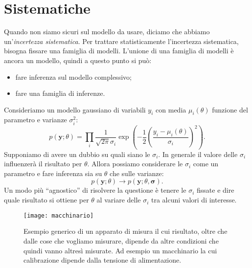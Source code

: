 
\section{Sistematiche}

Quando non siamo sicuri sul modello da usare,
diciamo che abbiamo un'\emph{incertezza sistematica}.
Per trattare statisticamente l'incertezza sistematica,
bisogna fissare una famiglia di modelli.
L'unione di una famiglia di modelli è ancora un modello,
quindi a questo punto si può:
\begin{itemize}
	\item fare inferenza sul modello complessivo;
	\item fare una famiglia di inferenze.
\end{itemize}

\begin{example}
	Consideriamo un modello gaussiano di variabili $y_i$
	con media $\mu_i(\theta)$ funzione del parametro e varianze $\sigma_i^2$:
	\begin{equation*}
		p(\mathbf y;\theta)
		= \prod_i \frac1{\sqrt{2\pi}\sigma_i}
		\exp\left(-\frac12\left(\frac{y_i-\mu_i(\theta)}{\sigma_i}\right)^2\right).
	\end{equation*}
	Supponiamo di avere un dubbio su quali siano le $\sigma_i$.
	In generale il valore delle $\sigma_i$ influenzerà il risultato per $\theta$.
	Allora possiamo considerare le $\sigma_i$ come un parametro
	e fare inferenza sia su $\theta$ che sulle varianze:
	\begin{equation*}
		p(\mathbf y;\theta) \rightarrow p(\mathbf y;\theta,\boldsymbol\sigma).
	\end{equation*}
	Un modo più ``agnostico'' di risolvere la questione è tenere le $\sigma_i$ fissate
	e dire quale risultato si ottiene per $\theta$ al variare delle $\sigma_i$
	tra alcuni valori di interesse.
\end{example}

\begin{figure}
	\centering
	\texttt{[image: macchinario]}
	\caption{\label{fig:macchinario}
	Esempio generico di un apparato di misura il cui risultato,
	oltre che dalle cose che vogliamo misurare,
	dipende da altre condizioni che quindi vanno altresì misurate.
	Ad esempio un macchinario la cui calibrazione dipende dalla tensione di alimentazione.}
\end{figure}

